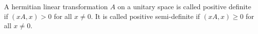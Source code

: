 A hermitian linear transformation $A$ on a unitary space is called positive definite if $(xA, x) > 0$ for all $x \neq 0$. It is called positive semi-definite if $(xA, x) \geq 0$ for all $x \neq 0$.
